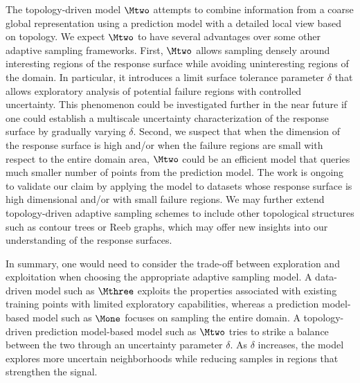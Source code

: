 The topology-driven model $\Mtwo$ attempts to combine information from a coarse global representation using a prediction model with a detailed local view based on topology.
%
We expect $\Mtwo$ to have several advantages over some other adaptive sampling frameworks.
%
First, $\Mtwo$ allows sampling densely around interesting regions of the response surface while avoiding uninteresting regions of the domain.
%
In particular, it introduces a limit surface tolerance parameter $\delta$ that allows exploratory analysis of potential failure regions with controlled uncertainty.
%
This phenomenon could be investigated further in the near future if one could establish a multiscale uncertainty characterization of the response surface by gradually varying $\delta$.
%
Second, we suspect that when the dimension of the response surface is high and/or when the failure regions are small with respect to the entire domain area, $\Mtwo$ could be an efficient model that queries much smaller number of points from the prediction model.
%
The work is ongoing to validate our claim by applying the model to datasets whose response surface is high dimensional and/or with small failure regions.
%
We may further extend topology-driven adaptive sampling schemes to include other topological structures such as contour trees or Reeb graphs, which may offer new insights into our understanding of the response surfaces.

In summary, one would need to consider the trade-off between exploration and exploitation when choosing the appropriate adaptive sampling model.
%
A data-driven model such as $\Mthree$ exploits the properties associated with existing training points with limited exploratory capabilities, whereas a prediction model-based model such as $\Mone$ focuses on sampling the entire domain.
%
A topology-driven prediction model-based model such as $\Mtwo$ tries to strike a balance between the two through an uncertainty parameter $\delta$.
%
As $\delta$ increases, the model explores more uncertain neighborhoods while reducing samples in regions that strengthen the signal.


